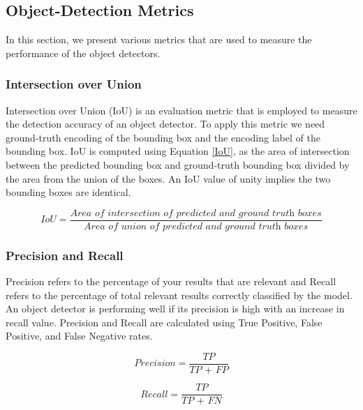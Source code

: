     
    \subsection{Object-Detection Metrics}
    In this section, we present various metrics that are used to measure the performance of the object detectors.
    \subsubsection{Intersection over Union}
    Intersection over Union (IoU) is an evaluation metric that is employed to measure the detection accuracy of an object detector. To apply this metric we need ground-truth encoding of the bounding box and the encoding label of the bounding box. IoU is computed using Equation \ref{IoU}, as the area of intersection between the predicted bounding box and ground-truth bounding box divided by the area from the union of the boxes. An IoU value of unity implies the two bounding boxes are identical.
    
    \begin{equation}
        IoU = \frac{\textit{Area of intersection of predicted and ground truth boxes}}{\textit{Area of union of predicted and ground truth boxes}}
        \label{IoU}
    \end{equation}
    
    \subsubsection{Precision and Recall}
    Precision refers to the percentage of your results that are relevant and Recall refers to the percentage of total relevant results correctly classified by the model. An object detector is performing well if its precision is high with an increase in recall value. Precision and Recall are calculated using True Positive, False Positive, and False Negative rates.
    
    \begin{equation}
    Precision = \frac{TP}{\textit{TP + FP}}
    \end{equation}
    
    \begin{equation}
    Recall = \frac{TP}{\textit{TP + FN}}
    \end{equation}
    
